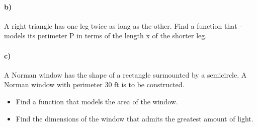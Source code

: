 \documentclass{tareaClass}
\begin{document}
\paragraph{b)}  A right triangle has one leg twice as long as the other. Find a function that
­models its perimeter P in terms of the length x of the shorter leg.

\paragraph{c)} A Norman window has the shape of a rectangle surmounted by a semicircle. 
A Norman window with perimeter 30 ft is to be constructed.
\begin{itemize}
    \item Find a function that models the area of the window.
    \item Find the dimensions of the window that admits the greatest amount of light.
\end{itemize}
\end{document}
